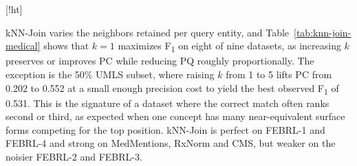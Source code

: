 \documentclass[runningheads]{llncs}
\makeatletter
\renewenvironment{table}
  {\setlength\abovecaptionskip{0\p@}%
   \setlength\belowcaptionskip{7\p@}%
   \@float{table}}
  {\end@float}
\makeatother
\begin{document}
\begin{table}[!ht]
\centering
\caption{kNN-Join on medical datasets. The selected value of $k$ maximizes F\textsubscript{1}
over $k \in \{1,5,10,20,50,100\}$. UMLS results use the ground-truth-complete 50\% subset.}
\label{tab:knn-join-medical}
\end{table}

kNN-Join varies the neighbors retained per query entity, and
Table~\ref{tab:knn-join-medical} shows that $k=1$ maximizes F\textsubscript{1} on eight of nine
datasets, as increasing $k$ preserves or improves PC while reducing PQ roughly proportionally.
The exception is the 50\% UMLS subset, where raising $k$ from 1 to 5 lifts PC from 0.202 to
0.552 at a small enough precision cost to yield the best observed F\textsubscript{1} of 0.531.
This is the signature of a dataset where the correct match often ranks second or third, as
expected when one concept has many near-equivalent surface forms competing for the top
position. kNN-Join is perfect on FEBRL-1 and FEBRL-4 and strong on MedMentions, RxNorm and CMS,
but weaker on the noisier FEBRL-2 and FEBRL-3.
\end{document}

